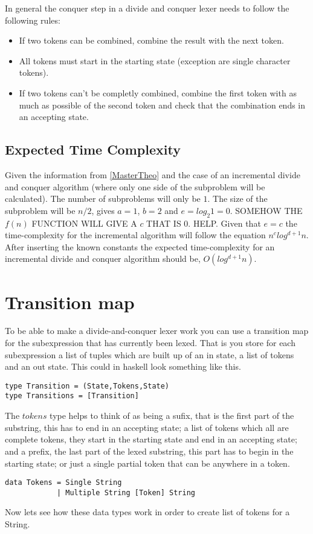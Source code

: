 In general the conquer step in a divide and conquer lexer needs to follow the following rules:
\begin{itemize}
\item If two tokens can be combined, combine the result with the next token.
\item All tokens must start in the starting state (exception are single
character tokens).
\item If two tokens can't be completly combined, combine the first token with as
much as possible of the second token and check that the combination ends in an
accepting state.
\end{itemize}

\subsection{Expected Time Complexity}
Given the information from \cref{MasterTheo} and the case of an incremental divide and conquer algorithm (where only one side of the subproblem will be calculated). The number of subproblems will only be $1$. The size of the subproblem will be $n/2$, gives $ a = 1$, $b = 2$ and $e = log_2 1 = 0$. SOMEHOW THE $f(n)$ FUNCTION WILL GIVE A $c$ THAT IS $0$. HELP.
Given that $e = c$ the time-complexity for the incremental algorithm will follow the equation $n^c log^{d+1} n$. After inserting the known constants the expected time-complexity for an incremental divide and conquer algorithm should be, $O(log^{d+1} n)$.

\section{Transition map}
To be able to make a divide-and-conquer lexer work you can use a transition map
for the subexpression that has currently been lexed. That is you store for each
subexpression a list of tuples which are built up of an in state, a list of
tokens and an out state. This could in haskell look something like this.
\begin{verbatim}
type Transition = (State,Tokens,State)
type Transitions = [Transition]
\end{verbatim}
The $tokens$ type helps to think of as being a sufix, that is the first part of
the substring, this has to end in an accepting state; a list of tokens which all
are complete tokens, they start in the starting state and end in an accepting
state; and a prefix, the last part of the lexed substring, this part has
to begin in the starting state; or just a single partial token that can be
anywhere in a token.
\begin{verbatim}
data Tokens = Single String
            | Multiple String [Token] String
\end{verbatim}
Now lets see how these data types work in order to create list of tokens for a
String.

